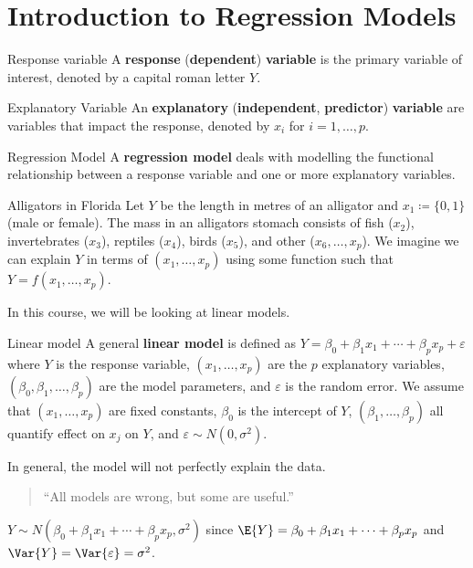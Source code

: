 \section{Introduction to Regression Models}
\begin{Definition}{Response variable}{}
    A \textbf{response} (\textbf{dependent})
    \textbf{variable} is the primary variable
    of interest, denoted by a capital
    roman letter $ Y $.
\end{Definition}
\begin{Definition}{Explanatory Variable}{}
    An \textbf{explanatory} (\textbf{independent}, \textbf{predictor})
    \textbf{variable} are variables that
    impact the response, denoted by $ x_i $
    for $ i=1,\ldots,p $.
\end{Definition}
\begin{Definition}{Regression Model}{}
    A \textbf{regression model}
    deals with modelling the functional relationship between a response
    variable and one or more explanatory variables.
\end{Definition}
\begin{Example}{Alligators in Florida}{}
    Let $ Y $ be the length in metres of an alligator
    and $ x_1\coloneq \{0,1\} $ (male or female).
    The mass in an alligators stomach consists of
    fish ($ x_2 $), invertebrates ($ x_3 $),
    reptiles ($ x_4 $), birds ($ x_5 $),
    and other ($ x_6,\ldots,x_p $).
    We imagine we can explain $ Y $ in terms
    of $ (x_1,\ldots,x_p) $ using some function
    such that $ Y=f(x_1,\ldots,x_p) $.
\end{Example}
In this course, we will be looking at linear models.
\begin{Definition}{Linear model}{}
    A general \textbf{linear model} is defined as
    $ Y=\beta_0+\beta_1x_1+\cdots+\beta_p x_p+\varepsilon $
    where $ Y $ is the response variable, $ (x_1,\ldots,x_p) $
    are the $ p $ explanatory variables,
    $ (\beta_0,\beta_1,\ldots,\beta_p) $
    are the model parameters, and $ \varepsilon $
    is the random error. We assume
    that $ (x_1,\ldots,x_p) $ are fixed constants,
    $ \beta_0 $ is the intercept of $ Y $,
    $ (\beta_1,\ldots,\beta_p) $ all quantify effect on $ x_j $
    on $ Y $, and $ \varepsilon \sim N(0,\sigma^2) $.
\end{Definition}
\begin{Remark}{}{}
    In general, the model will not perfectly explain the data.
    \begin{quote}
        ``All models are wrong, but some are useful.''
    \end{quote}
\end{Remark}
$ Y \sim N\left(\beta_0+\beta_1x_1+\cdots+\beta_p x_p,\sigma^2\right) $
since $ \E{Y}=\beta_0+\beta_1x_1+\cdots+\beta_p x_p $ and
$ \Var{Y}=\Var{\varepsilon}=\sigma^2 $.
